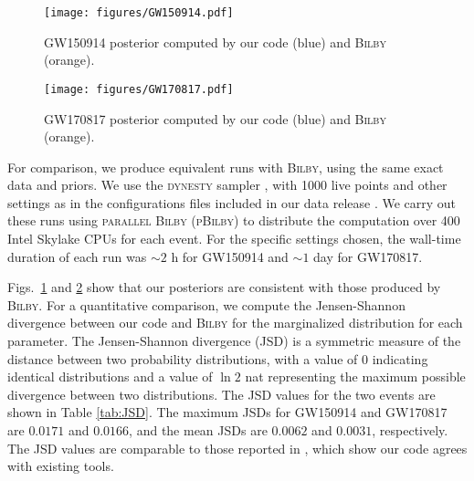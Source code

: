 \documentclass[twocolumn]{aastex631}
\begin{document}
\begin{figure}
    \texttt{[image: figures/GW150914.pdf]}
    \caption{
      GW150914 posterior computed by our code (blue) and \textsc{Bilby} (orange).
    }
    \label{fig:GW150914}
\end{figure}

\begin{figure}
\texttt{[image: figures/GW170817.pdf]}
\caption{
    GW170817 posterior computed by our code (blue) and \textsc{Bilby} (orange).
}
\label{fig:GW170817}
\end{figure}

For comparison, we produce equivalent runs with \textsc{Bilby}, using the same
exact data and priors.  We use the \textsc{dynesty} sampler
\citep{2020MNRAS.493.3132S,dynesty}, with 1000 live points and other settings as
in the configurations files included in our data release \citep{release}.  We
carry out these runs using \textsc{parallel Bilby} (\textsc{pBilby})
\citep{Smith:2019ucc} to distribute the computation over 400 Intel Skylake CPUs
for each event.  For the specific settings chosen, the wall-time duration of
each run was ${\sim}2$ h for GW150914 and ${\sim}1$ day for GW170817.


Figs.~\ref{fig:GW150914} and \ref{fig:GW170817} show that our posteriors are
consistent with those produced by \textsc{Bilby}.  For a quantitative
comparison, we compute the Jensen-Shannon divergence between our code and
\textsc{Bilby} for the marginalized distribution for each parameter. The
Jensen-Shannon divergence (JSD) is a symmetric measure of the distance between
two probability distributions, with a value of 0 indicating identical
distributions and a value of $\ln{2}$ nat representing the maximum
possible divergence between two distributions. The JSD values for the two events
are shown in Table \ref{tab:JSD}. The maximum JSDs for GW150914 and GW170817 are
$0.0171$ and $0.0166$, and the mean JSDs are $0.0062$ and $0.0031$,
respectively. The JSD values are comparable to those reported in
\cite{Romero-Shaw:2020owr}, which show our code agrees with existing tools.
\end{document}
